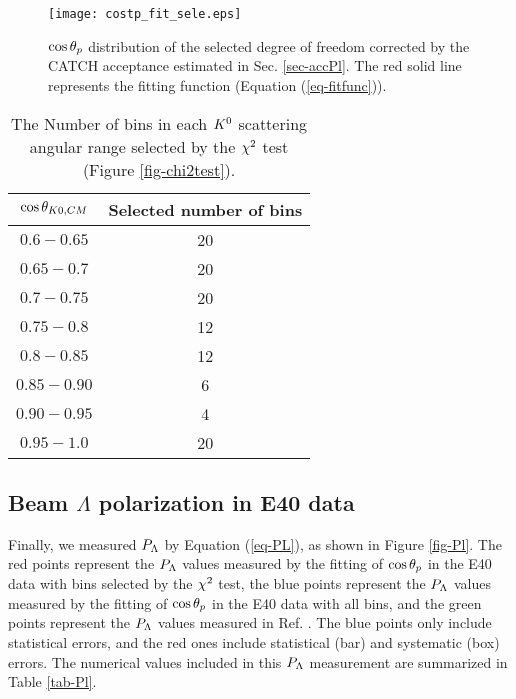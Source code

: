 \begin{figure}[h]
  \centering
  \texttt{[image: costp\_fit\_sele.eps]}
  \caption{$\cos{\theta_p}$ distribution of the selected degree of freedom corrected by the CATCH acceptance estimated in Sec. \ref{sec-accPl}. The red solid line represents the fitting function (Equation (\ref{eq-fitfunc})).}
  \label{fig-costp_fit_sele}
\end{figure}

\begin{table}[!h] 
  \begin{center}
  \caption{The Number of bins in each $K^{0}$ scattering angular range selected by the $\chi^{2}$ test (Figure \ref{fig-chi2test}).}
  \centering
  \begin{threeparttable}
    \begin{tabular}{cc}
    $\cos{\theta_{K0,CM}}$ & Selected number of bins \\
    \midrule\midrule
    $0.6-0.65$ & 20 \\
    \midrule
    $0.65-0.7$ & 20 \\
    \midrule
    $0.7-0.75$ & 20 \\
    \midrule
    $0.75-0.8$ & 12 \\
    \midrule
    $0.8-0.85$ & 12 \\
    \midrule
    $0.85-0.90$ & 6 \\
    \midrule
    $0.90-0.95$ & 4 \\
    \midrule
    $0.95-1.0$ & 20 \\
    \end{tabular}
  \end{threeparttable}
  \label{tab-selebin}
  \end{center}
\end{table}
  


\clearpage
\subsection{Beam $\Lambda$ polarization in E40 data}

Finally, we measured $P_{\Lambda}$ by Equation (\ref{eq-PL}), as shown in Figure \ref{fig-Pl}. 
The red points represent the $P_{\Lambda}$ values measured by the fitting of $\cos{\theta_p}$ in the E40 data with bins selected by the $\chi^{2}$ test, the blue points represent the $P_{\Lambda}$ values measured by the fitting of $\cos{\theta_p}$ in the E40 data with all bins, and the green points represent the $P_{\Lambda}$ values measured in Ref. \cite{Baker}. The blue points only include statistical errors, and the red ones include statistical (bar) and systematic (box) errors. The numerical values included in this $P_{\Lambda}$ measurement are summarized in Table \ref{tab-Pl}.

